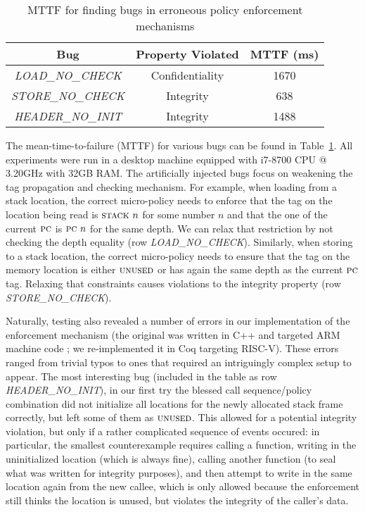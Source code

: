 \documentclass[acmsmall,review,anonymous]{acmart}\settopmatter{printfolios=true,printccs=false,printacmref=false}
\begin{document}
\begin{table}[]
\centering
\begin{tabular}{c|c|c}
  Bug & Property Violated & MTTF (ms) \\
  \hline
      {\em LOAD\_NO\_CHECK}  & Confidentiality & 1670 \\
      {\em STORE\_NO\_CHECK} & Integrity & 638 \\
      {\em HEADER\_NO\_INIT} & Integrity & 1488 \\
\end{tabular}
\vspace*{1em}
\caption{MTTF for finding bugs in erroneous policy enforcement mechanisms}
\vspace*{-2em}
\label{tab:bug-table}
\end{table}  

The mean-time-to-failure (MTTF) for various bugs can be found in
Table~\ref{tab:bug-table}. All experiments were run in a desktop
machine equipped with i7-8700 CPU @ 3.20GHz with 32GB
RAM. 
%
The artificially injected bugs focus on weakening the tag propagation
and checking mechanism. 
%
For example, when loading from a stack location, the correct
micro-policy needs to enforce that the tag on the location being read
is $\textsc{stack} ~ n$ for some number $n$ and that the one of the
current $\textsc{pc}$ is $\textsc{pc} ~ n$ for the same depth. We can relax
that restriction by not checking the depth equality (row {\em
  LOAD\_NO\_CHECK}).
%
Similarly, when storing to a stack location, the correct micro-policy
needs to ensure that the tag on the memory location is either
$\textsc{unused}$ or has again the same depth as the current $\textsc{pc}$
tag. Relaxing that constraints causes violations to the integrity
property (row {\em STORE\_NO\_CHECK}).

Naturally, testing also revealed a number of errors in our
implementation of the enforcement mechanism (the original was written in C++
and targeted ARM machine code
; we re-implemented it in Coq targeting RISC-V).  These errors ranged
from trivial typos to ones that required an intriguingly complex setup
to appear.  The most interesting bug (included in the table as row
{\em HEADER\_NO\_INIT}), in our first try the blessed call
sequence/policy combination did not initialize all locations for the
newly allocated stack frame correctly, but left some of them as
$\textsc{unused}$. This allowed for a potential integrity violation, but
only if a rather complicated sequence of events occured: in
particular, the smallest counterexample requires calling a function,
writing in the uninitialized location (which is always fine), calling
another function (to seal what was written for integrity purposes),
and then attempt to write in the same location again from the new
callee, which is only allowed because the enforcement still thinks
the location is unused, but violates the integrity of the caller's data.
\end{document}

